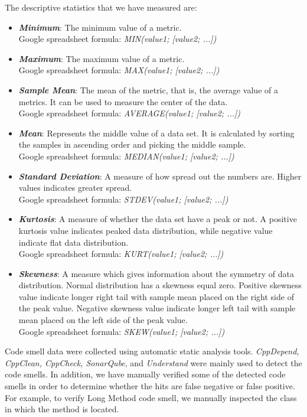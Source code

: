 The descriptive statistics that we have measured are:
\begin{itemize}
	\item \textbf{\textit{Minimum}}: The minimum value of a metric. \\ Google spreadsheet formula: \textit{MIN(value1; [value2; ...])}
	\item \textbf{\textit{Maximum}}: The maximum value of a metric. \\ Google spreadsheet formula: \textit{MAX(value1; [value2; ...])}
	\item \textbf{\textit{Sample Mean}}: The mean of the metric, that is, the average value of a metrics. It can be used to measure the center of the data. \\ Google spreadsheet formula: \textit{AVERAGE(value1; [value2; ...])}
	\item \textbf{\textit{Mean}}: Represents the middle value of a data set. It is calculated by sorting the samples in ascending order and picking the middle sample\cite{Wohlin:2000:ESE:330775}. \\ Google spreadsheet formula: \textit{MEDIAN(value1; [value2; ...])}
	\item \textbf{\textit{Standard Deviation}}: A measure of how spread out the numbers are. Higher values indicates greater spread. \\ Google spreadsheet formula: \textit{STDEV(value1; [value2; ...])}
	\item \textbf{\textit{Kurtosis}}: A measure of whether the data set have a peak or not. A positive kurtosis value indicates peaked data distribution, while negative value indicate flat data distribution. \\ Google spreadsheet formula: \textit{KURT(value1; [value2; ...])}
	\item \textbf{\textit{Skewness}}: A measure which gives information about the symmetry of data distribution. Normal distribution has a skewness equal zero. Positive skewness value indicate longer right tail with sample mean placed on the right side of the peak value. Negative skewness value indicate longer left tail with sample mean placed on the left side of the peak value. \\ Google spreadsheet formula: \textit{SKEW(value1; [value2; ...])}
\end{itemize}

Code smell data were collected using automatic static analysis tools. \textit{CppDepend, CppClean, CppCheck, SonarQube}, and \textit{Understand} were mainly used to detect the code smells. In addition, we have manually verified some of the detected code smells in order to determine whether the hits are false negative or false positive. For example, to verify Long Method code smell, we manually inspected the class in which the method is located. 


